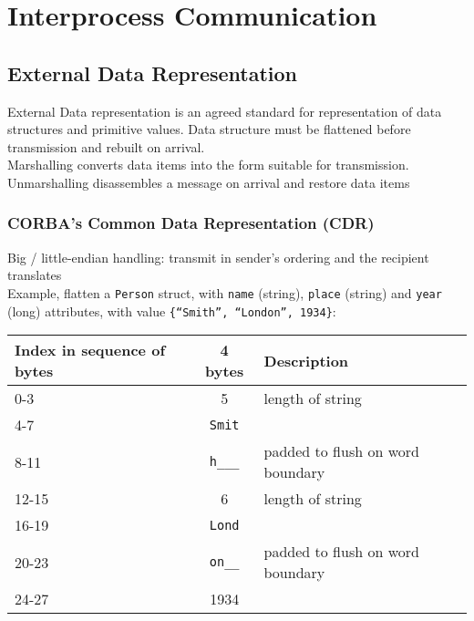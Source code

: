 \chapter{Interprocess Communication}

\begin{multicols*}{2}
\section{External Data Representation}

\noindent External Data representation is an agreed standard for representation of data structures and primitive values. Data structure must be flattened before transmission and rebuilt on arrival. \\

\noindent Marshalling converts data items into the form suitable for transmission. Unmarshalling disassembles a message on arrival and restore data items

\subsection{CORBA’s Common Data Representation (CDR)}

\noindent Big / little-endian handling: transmit in sender’s ordering and the recipient translates\\

\noindent Example, flatten a \verb|Person| struct, with \verb|name| (string), \verb|place| (string) and \verb|year| (long) attributes, with value \verb|{“Smith”, “London”, 1934}|:\\

\begin{center}
\begin{tabular}{ |m{2cm}|c|p{4cm}| } 
    \hline
    Index in sequence of bytes & 4 bytes & Description \\
    \hline 
    0-3   & 5           & length of string \\
    4-7   & \verb|Smit| & \\
    8-11  & \verb|h___| & padded to flush on word boundary \\
    12-15 & 6           & length of string \\
    16-19 & \verb|Lond| & \\
    20-23 & \verb|on__| & padded to flush on word boundary \\
    24-27 & 1934        & \\
    \hline
\end{tabular}
\end{center}


\end{multicols*}

